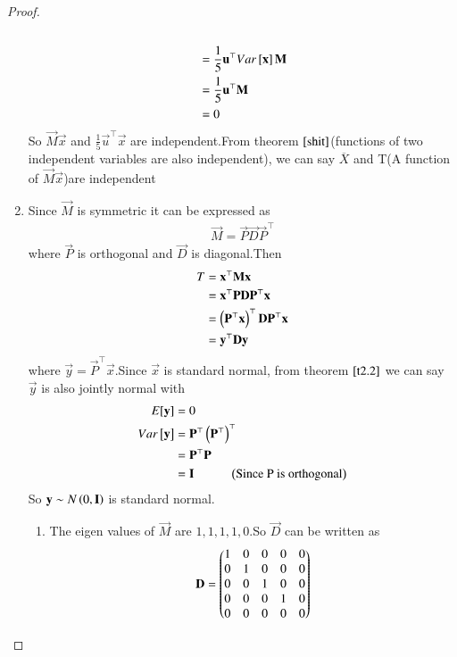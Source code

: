 \documentclass[journal,12pt,twocolumn]{IEEEtran}
\begin{document}
\begin{proof}
\begin{enumerate}
\begin{multline}
\end{multline}
\begin{align}
    &=\frac{1}{5}\mathbf{u}^{\top}Var{}\left[\mathbf{x}\right]\mathbf{M}\\
    &=\frac{1}{5}\mathbf{u}^{\top}\mathbf{M}\\
    &=0
\end{align}
So $\vec{M}\vec{x}$ and $\frac{1}{5}\vec{u}^{\top}\vec{x}$ are independent.From theorem $\ref{shit}$(functions of two independent variables are also independent), we can say $\overline{X}$ and T(A function of $\vec{M}\vec{x}$)are independent
\item Since $\vec{M}$ is symmetric it can be expressed as
\begin{align}
    \vec{M}=\vec{P}\vec{D}\vec{P}^{\top}
\end{align}
where $\vec{P}$ is orthogonal and $\vec{D}$ is diagonal.Then
\begin{align}
    T&=\mathbf{x}^{\top}\mathbf{M}\mathbf{x}\\
    &=\mathbf{x}^{\top}\mathbf{P}\mathbf{D}\mathbf{P}^{\top}\mathbf{x}\\
    &=\left(\mathbf{P}^{\top}\mathbf{x}\right)^{\top}\mathbf{D}\mathbf{P}^{\top}\mathbf{x}\\
    &=\mathbf{y}^{\top}\mathbf{D}\mathbf{y}
\end{align}
where $\vec{y}=\vec{P}^{\top}\vec{x}$.Since $\vec{x}$ is standard normal, from theorem $\ref{t2.2}$ we can say $\vec{y}$ is also jointly normal with
\begin{align}
    E[ \mathbf{y} ]&=0\\
    Var{}\left[\mathbf{y}\right]&=\mathbf{P}^{\top}\left(\mathbf{P}^{\top}\right)^{\top}\\
    &=\mathbf{P}^{\top}\mathbf{P}\\
    &=\mathbf{I} \hspace{1cm} \left(\text{Since P is orthogonal}\right)
\end{align}
So $\mathbf{y}\sim N\left(0,\mathbf{I}\right)$ is standard normal.
\begin{enumerate}
    \item The eigen values of $\vec{M}$ are $1,1,1,1,0$.So $\vec{D}$ can be written as
    \begin{align}
        \mathbf{D}=\begin{pmatrix}1&0&0&0&0\\
                       0&1&0&0&0\\
                       0&0&1&0&0\\
                       0&0&0&1&0\\
                       0&0&0&0&0\end{pmatrix}
    \end{align}

\end{enumerate}
\end{enumerate}
\end{proof}
\end{document}

